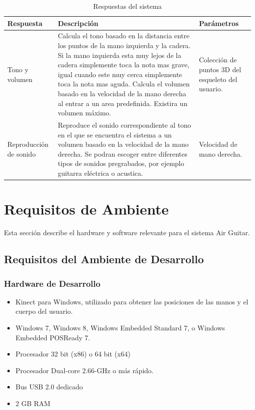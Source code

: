 \documentclass[a4paper,12pt]{article}
\begin{document}
\begin{table}[h!]
        \centering
        \begin{tabular}{|p{3cm}|p{6cm}|p{4cm}|}
                \hline
                \textbf{Respuesta} & \textbf{Descripción} & \textbf{Parámetros} \\
                \hline
                Tono y volumen & Calcula el tono basado en la distancia entre
                los puntos de la mano izquierda y la cadera.
                Si la mano izquierda esta muy lejos de la cadera simplemente toca la nota mas grave, igual cuando este muy cerca simplemente toca la nota mas aguda. Calcula el volumen
                basado en la velocidad de la mano derecha al entrar a un area predefinida. Existira un volumen máximo. & Colección de
                puntos 3D del esqueleto del usuario. \\
                \hline
                Reproducción de sonido & Reproduce el sonido correspondiente al
                tono en el que se encuentra el sistema a un volumen basado en
                la velocidad de la mano derecha. Se podran escoger entre diferentes tipos de sonidos pregrabados, por ejemplo guitarra eléctrica o acustica. & Velocidad de mano derecha. \\
                \hline
        \end{tabular}
        \caption{Respuestas del sistema}
        \label{tab:respuesta}
\end{table}

\newpage
\section{Requisitos de Ambiente}
Esta sección describe el hardware y software relevante para el sistema Air
Guitar.
\subsection{Requisitos del Ambiente de Desarrollo}
\subsubsection{Hardware de Desarrollo}
\label{subsubsec:hardware}

\begin{itemize}
        \item Kinect para Windows, utilizado para obtener las posiciones de las
                manos y el cuerpo del usuario.
        \item Windows 7, Windows 8, Windows Embedded Standard 7, o Windows
                Embedded POSReady 7.
        \item Procesador 32 bit (x86) o 64 bit (x64) 
        \item Procesador Dual-core 2.66-GHz o más rápido. 
        \item Bus USB 2.0 dedicado
        \item 2 GB RAM
\end{itemize}
\end{document}
